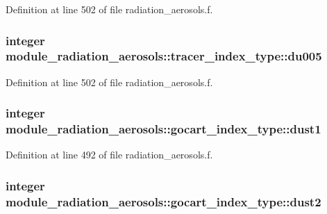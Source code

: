 Definition at line 502 of file radiation\+\_\+aerosols.\+f.

\subsubsection[{\texorpdfstring{du005}{du005}}]{\setlength{\rightskip}{0pt plus 5cm}integer module\+\_\+radiation\+\_\+aerosols\+::tracer\+\_\+index\+\_\+type\+::du005\hspace{0.3cm}{\ttfamily [private]}}\hypertarget{group__module__radiation__aerosols_gaabd67af89106955952b0010bb3a70e4e}{}\label{group__module__radiation__aerosols_gaabd67af89106955952b0010bb3a70e4e}


Definition at line 502 of file radiation\+\_\+aerosols.\+f.

\subsubsection[{\texorpdfstring{dust1}{dust1}}]{\setlength{\rightskip}{0pt plus 5cm}integer module\+\_\+radiation\+\_\+aerosols\+::gocart\+\_\+index\+\_\+type\+::dust1\hspace{0.3cm}{\ttfamily [private]}}\hypertarget{group__module__radiation__aerosols_gae87b7754284ce0d44cab3ab11c7d302d}{}\label{group__module__radiation__aerosols_gae87b7754284ce0d44cab3ab11c7d302d}


Definition at line 492 of file radiation\+\_\+aerosols.\+f.

\subsubsection[{\texorpdfstring{dust2}{dust2}}]{\setlength{\rightskip}{0pt plus 5cm}integer module\+\_\+radiation\+\_\+aerosols\+::gocart\+\_\+index\+\_\+type\+::dust2\hspace{0.3cm}{\ttfamily [private]}}\hypertarget{group__module__radiation__aerosols_gaaf95cb5b3df728ac3b333edd8ab7820f}{}\label{group__module__radiation__aerosols_gaaf95cb5b3df728ac3b333edd8ab7820f}


